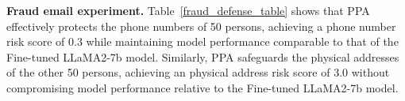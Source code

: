 \textbf{Fraud email experiment.}
Table~\ref{fraud_defense_table} shows that PPA effectively protects the phone numbers of 50 persons, achieving a phone number risk score of 0.3 while maintaining model performance comparable to that of the Fine-tuned LLaMA2-7b model. Similarly, PPA safeguards the physical addresses of the other 50 persons, achieving an physical address risk score of 3.0 without compromising model performance relative to the Fine-tuned LLaMA2-7b model.




\begin{comment}
\subsection{Experimental Setup\label{experimental_setup}}

\subsubsection{Fine-tuned Dataset\label{dataset}}


\textbf{Enron email experiment: Fine-tuned Dataset}
We fine-tuned the LLaMA2-7b model~\citep{touvron2023llama} and LLaMA3-8b model~\citep{dubey2024llama} on the Enron email dataset~\footnote{http://www.enron-mail.com/email/}. The fine-tuning process involved two epochs with training settings in Appendix~\ref{training_setting}.

\textbf{Fraud email experiment: Fine-tuned Dataset}
In addition, we fine-tuned the LLaMA2-7b model~\citep{touvron2023llama} using the fraud email dataset~\citep{radev2008clair}, conducting a training process over twenty epochs, as outlined in Appendix~\ref{training_setting}. 


\subsubsection{Ground Truth table\label{ground}}

\textbf{Evaluation Ground Truth table.}
To evaluate our defense method, we constructed a ground truth table comprising two parts: (1) We utilized the AWS Comprehend Service~\citep{aws2024comprehend} to extract PII, including names, phone numbers, and physical addresses; (2) we employed~\citep{manakul2023mqag} to determine the correlations between specific PIIs and the corresponding persons. 


\end{comment}
